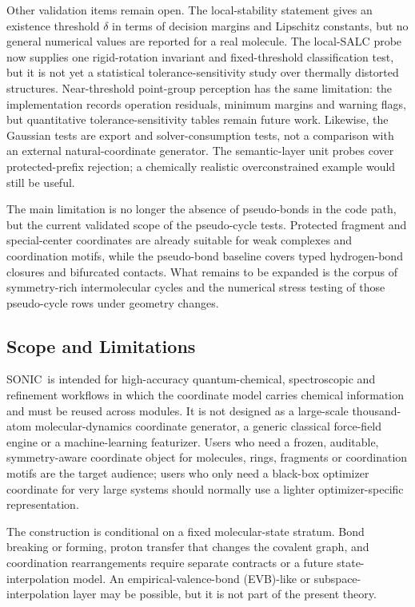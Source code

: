 \documentclass[journal=jctcce,manuscript=article,layout=traditional]{achemso}
\newcommand{\SONIC}{SONIC}
\theoremstyle{definition}
\begin{document}
Other validation items remain open.  The local-stability statement gives an
existence threshold \(\delta\) in terms of decision margins and Lipschitz
constants, but no general numerical values are reported for a real molecule.
The local-SALC probe now supplies one rigid-rotation invariant and fixed-threshold
classification test, but it is not yet a statistical tolerance-sensitivity
study over thermally distorted structures.
Near-threshold point-group perception has the same limitation: the
implementation records operation residuals, minimum margins and warning flags,
but quantitative tolerance-sensitivity tables remain future work.  Likewise,
the Gaussian tests are export and solver-consumption tests, not a comparison
with an external natural-coordinate generator.  The semantic-layer unit probes
cover protected-prefix rejection; a chemically realistic overconstrained
example would still be useful.

The main limitation is no longer the absence of pseudo-bonds in the code path,
but the current validated scope of the pseudo-cycle tests.  Protected fragment
and special-center coordinates are already suitable for weak complexes and
coordination motifs, while the pseudo-bond baseline covers typed hydrogen-bond
closures and bifurcated contacts.  What remains to be expanded is the corpus of
symmetry-rich intermolecular cycles and the numerical stress testing of those
pseudo-cycle rows under geometry changes.

\subsection{Scope and Limitations}
\label{sec:scope-limitations}

\SONIC\ is intended for high-accuracy quantum-chemical, spectroscopic and
refinement workflows in which the coordinate model carries chemical information
and must be reused across modules.  It is not designed as a large-scale
thousand-atom molecular-dynamics coordinate generator, a generic classical
force-field engine or a machine-learning featurizer.  Users who need a frozen,
auditable, symmetry-aware coordinate object for molecules, rings, fragments
or coordination motifs are the target audience; users who only need a
black-box optimizer coordinate for very large systems should normally use a
lighter optimizer-specific representation.

The construction is conditional on a fixed molecular-state stratum.  Bond
breaking or forming, proton transfer that changes the covalent graph, and
coordination rearrangements require separate contracts or a future
state-interpolation model.  An empirical-valence-bond (EVB)-like or
subspace-interpolation layer may be
possible, but it is not part of the present theory.
\end{document}
